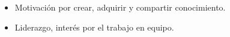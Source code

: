 %
%
%

\twocolumnsection
{
\begin{skills}
\end{skills}}
{
\vspace{1em}
\begin{itemize}
	\item Motivación por crear, adquirir y compartir conocimiento.
	\item Liderazgo, interés por el trabajo en equipo.                    
\end{itemize}
}
